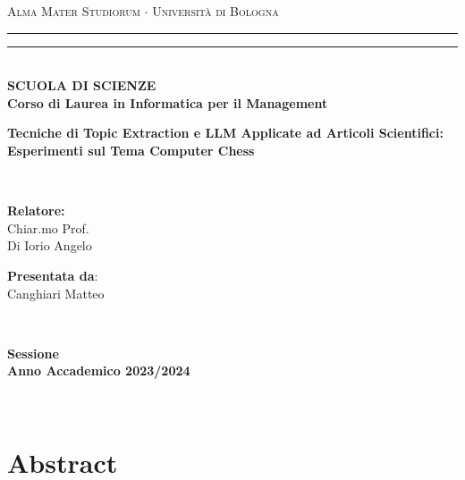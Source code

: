 \documentclass[12pt,a4paper,twoside]{book}
\newcommand{\rom}[1]{\uppercase\expandafter{\romannumeral #1\relax}}
\begin{document}
\pagestyle{empty}
\begin{titlepage}
\begin{center}
    {{\Large{\textsc{Alma Mater Studiorum $\cdot$ Università di Bologna}}}}
    \rule[0.1cm]{\textwidth}{0.1mm}
    \rule[0.5cm]{\textwidth}{0.6mm}\\
    {\small{\bf SCUOLA DI SCIENZE\\
    Corso di Laurea in Informatica per il Management}}
\end{center}

\vspace{45mm}

\begin{center}
    \textbf{Tecniche di Topic Extraction e LLM Applicate ad Articoli Scientifici: \vspace{3.5pt} \\ Esperimenti sul Tema Computer Chess}
\end{center}

\vspace{60mm}
\par
\noindent
\begin{minipage}[t]{0.04\textwidth}
~
\end{minipage}
\begin{minipage}[t]{0.4\textwidth}
{{\textbf{Relatore:}\\
Chiar.mo Prof.\\
Di Iorio Angelo}}
\end{minipage}
\hfill
\begin{minipage}[t]{0.4\textwidth}\raggedleft
{{\textbf{Presentata da}:\\
Canghiari Matteo}}
\end{minipage}
\begin{minipage}[t]{0.04\textwidth}
~
\end{minipage}

\vspace{30mm}

\begin{center}
    {\large{\bf \rom{3} Sessione\\
    Anno Accademico 2023/2024 }}
\end{center}
\end{titlepage}

\restoregeometry

\newpage~\newpage

\pagestyle{plain}
\chapter*{Abstract}

\end{document}
